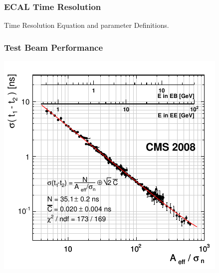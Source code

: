 \documentclass{beamer}
\begin{document}
\begin{frame}
\begin{minipage}[t]{\paperwidth}
\begin{tcolorbox}[colback=UNL@Cream!5,colframe=UNL@Cream!70,title=\textcolor{UMN@Maroon}{\textbf{Time Measurement}}]
           
   
     
  \end{tcolorbox}
\end{minipage}
\end{frame}

\begin{frame}
\frametitle{\Huge{ECAL Time Resolution}}
Time Resolution Equation and parameter Definitions.

\end{frame}

   
\begin{frame}
\frametitle{\Huge{Test Beam Performance}}
 \includegraphics[height=0.65\paperwidth,width=0.85\paperwidth]{THESISPLOTS/ECAL_Timing_Resolution.png}   
\end{frame}   
   
\end{document}
